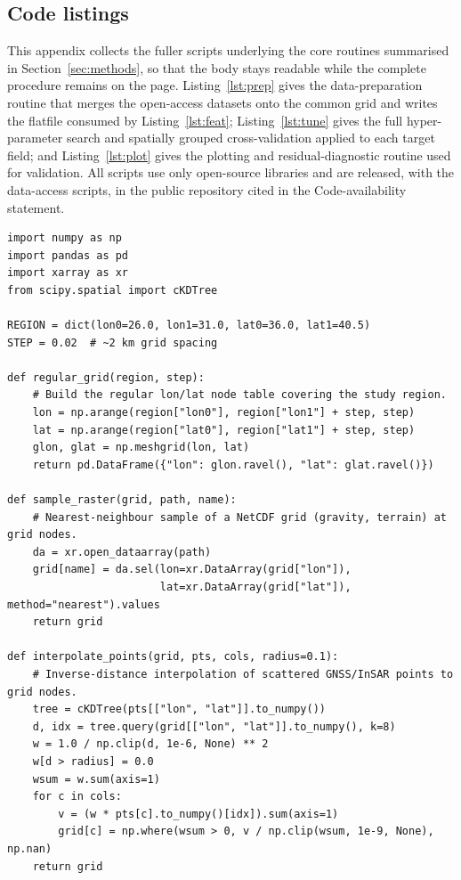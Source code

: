 \documentclass[pdflatex,sn-mathphys-num]{sn-jnl}%
\theoremstyle{thmstyleone}%
\theoremstyle{thmstyletwo}%
\theoremstyle{thmstylethree}%
\begin{document}
\begin{appendices}

\section{Code listings}\label{secA1}
This appendix collects the fuller scripts underlying the core routines summarised in
Section~\ref{sec:methods}, so that the body stays readable while the complete
procedure remains on the page. Listing~\ref{lst:prep} gives the data-preparation
routine that merges the open-access datasets onto the common grid and writes the
flatfile consumed by Listing~\ref{lst:feat}; Listing~\ref{lst:tune} gives the full
hyper-parameter search and spatially grouped cross-validation applied to each target
field; and Listing~\ref{lst:plot} gives the plotting and residual-diagnostic routine
used for validation. All scripts use only open-source libraries and are released, with
the data-access scripts, in the public repository cited in the Code-availability
statement.

\begin{lstlisting}[style=py,caption={Full data-preparation routine: merge the open-access GNSS, InSAR, EGM2008 gravity, catalogue and terrain layers onto the common 0.02$^{\circ}$ grid, mask built-up areas, assign spatial blocks, and write the analysis flatfile.},label={lst:prep}]
import numpy as np
import pandas as pd
import xarray as xr
from scipy.spatial import cKDTree

REGION = dict(lon0=26.0, lon1=31.0, lat0=36.0, lat1=40.5)
STEP = 0.02  # ~2 km grid spacing

def regular_grid(region, step):
    # Build the regular lon/lat node table covering the study region.
    lon = np.arange(region["lon0"], region["lon1"] + step, step)
    lat = np.arange(region["lat0"], region["lat1"] + step, step)
    glon, glat = np.meshgrid(lon, lat)
    return pd.DataFrame({"lon": glon.ravel(), "lat": glat.ravel()})

def sample_raster(grid, path, name):
    # Nearest-neighbour sample of a NetCDF grid (gravity, terrain) at grid nodes.
    da = xr.open_dataarray(path)
    grid[name] = da.sel(lon=xr.DataArray(grid["lon"]),
                        lat=xr.DataArray(grid["lat"]), method="nearest").values
    return grid

def interpolate_points(grid, pts, cols, radius=0.1):
    # Inverse-distance interpolation of scattered GNSS/InSAR points to grid nodes.
    tree = cKDTree(pts[["lon", "lat"]].to_numpy())
    d, idx = tree.query(grid[["lon", "lat"]].to_numpy(), k=8)
    w = 1.0 / np.clip(d, 1e-6, None) ** 2
    w[d > radius] = 0.0
    wsum = w.sum(axis=1)
    for c in cols:
        v = (w * pts[c].to_numpy()[idx]).sum(axis=1)
        grid[c] = np.where(wsum > 0, v / np.clip(wsum, 1e-9, None), np.nan)
    return grid


\end{lstlisting}
\end{appendices}
\end{document}
